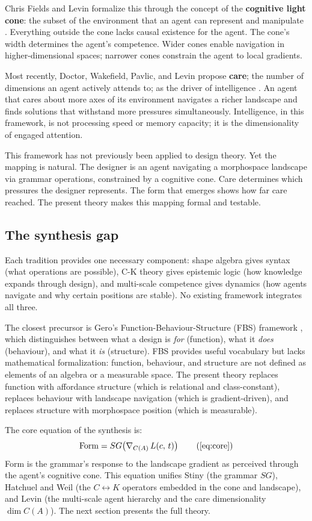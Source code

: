 Chris Fields and Levin formalize this through the concept of the \textbf{cognitive light cone}: the subset of the environment that an agent can represent and manipulate \parencite{Fields2022}. Everything outside the cone lacks causal existence for the agent. The cone's width determines the agent's competence. Wider cones enable navigation in higher-dimensional spaces; narrower cones constrain the agent to local gradients.

Most recently, Doctor, Wakefield, Pavlic, and Levin propose \textbf{care}; the number of dimensions an agent actively attends to; as the driver of intelligence \parencite{Doctor2024}. An agent that cares about more axes of its environment navigates a richer landscape and finds solutions that withstand more pressures simultaneously. Intelligence, in this framework, is not processing speed or memory capacity; it is the dimensionality of engaged attention.

This framework has not previously been applied to design theory. Yet the mapping is natural. The designer is an agent navigating a morphospace landscape via grammar operations, constrained by a cognitive cone. Care determines which pressures the designer represents. The form that emerges shows how far care reached. The present theory makes this mapping formal and testable.

\subsection{The synthesis gap}

Each tradition provides one necessary component: shape algebra gives syntax (what operations are possible), C-K theory gives epistemic logic (how knowledge expands through design), and multi-scale competence gives dynamics (how agents navigate and why certain positions are stable). No existing framework integrates all three.

The closest precursor is Gero's Function-Behaviour-Structure (FBS) framework \parencite{Gero1990}, which distinguishes between what a design is \textit{for} (function), what it \textit{does} (behaviour), and what it \textit{is} (structure). FBS provides useful vocabulary but lacks mathematical formalization: function, behaviour, and structure are not defined as elements of an algebra or a measurable space. The present theory replaces function with affordance structure (which is relational and class-constant), replaces behaviour with landscape navigation (which is gradient-driven), and replaces structure with morphospace position (which is measurable).

The core equation of the synthesis is:
\begin{equation}
\mathrm{Form} = SG\!\left(\nabla_{C(A)}\, L(c,\, t)\right)
\tag{\ref{eq:core}}
\end{equation}
\noindent Form is the grammar's response to the landscape gradient as perceived through the agent's cognitive cone. This equation unifies Stiny (the grammar $SG$), Hatchuel and Weil (the $C \leftrightarrow K$ operators embedded in the cone and landscape), and Levin (the multi-scale agent hierarchy and the care dimensionality $\dim C(A)$). The next section presents the full theory.
